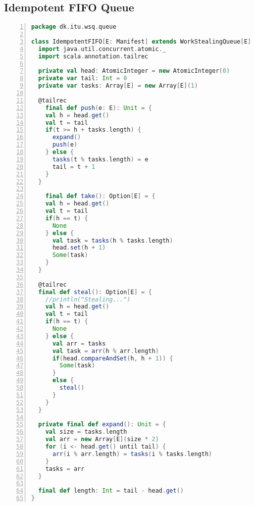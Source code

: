 \subsection{Idempotent FIFO Queue}
\begin{lstlisting}[language=scala,basicstyle=\ttfamily\bfseries\scriptsize,numbers=left]
package dk.itu.wsq.queue

class IdempotentFIFO[E: Manifest] extends WorkStealingQueue[E] {
  import java.util.concurrent.atomic._
  import scala.annotation.tailrec

  private val head: AtomicInteger = new AtomicInteger(0)
  private var tail: Int = 0
  private var tasks: Array[E] = new Array[E](1)

  @tailrec
	final def push(e: E): Unit = {
    val h = head.get()
    val t = tail
    if(t >= h + tasks.length) {
      expand()
      push(e)
    } else {
      tasks(t % tasks.length) = e
      tail = t + 1 
    }
  }

	final def take(): Option[E] = {
    val h = head.get()
    val t = tail
    if(h == t) {
      None
    } else {
      val task = tasks(h % tasks.length)
      head.set(h + 1)
      Some(task)
    }
  }

  @tailrec
  final def steal(): Option[E] = {
    //println("Stealing...")
    val h = head.get()
    val t = tail
    if(h == t) {
      None
    } else {
      val arr = tasks
      val task = arr(h % arr.length)
      if(head.compareAndSet(h, h + 1)) {
        Some(task)
      }
      else {
        steal()
      }
    }
  }

  private final def expand(): Unit = {
    val size = tasks.length
    val arr = new Array[E](size * 2)
    for (i <- head.get() until tail) {
      arr(i % arr.length) = tasks(i % tasks.length)
    }
    tasks = arr
  }

  final def length: Int = tail - head.get()
}

\end{lstlisting}

